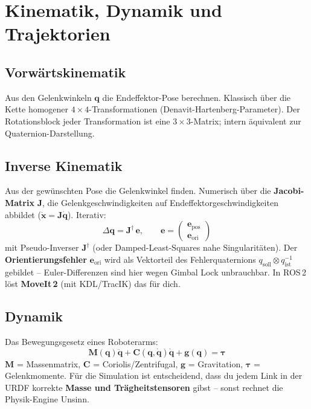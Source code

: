 
\chapter{Kinematik, Dynamik und Trajektorien}
\label{ch:kinematik}

\section{Vorwärtskinematik}
Aus den Gelenkwinkeln $\bm{q}$ die Endeffektor-Pose berechnen. Klassisch über
die Kette homogener $4\times4$-Transformationen (Denavit-Hartenberg-Parameter).
Der Rotationsblock jeder Transformation ist eine $3\times3$-Matrix; intern
äquivalent zur Quaternion-Darstellung.

\section{Inverse Kinematik}
Aus der gewünschten Pose die Gelenkwinkel finden. Numerisch über die
\textbf{Jacobi-Matrix} $\bm{J}$, die Gelenkgeschwindigkeiten auf
Endeffektorgeschwindigkeiten abbildet ($\dot{\bm{x}} = \bm{J}\dot{\bm{q}}$).
Iterativ:
\begin{equation}
\Delta\bm{q} = \bm{J}^{\dagger}\,\bm{e},
\qquad
\bm{e} = \begin{pmatrix}\bm{e}_{\text{pos}} \\ \bm{e}_{\text{ori}}\end{pmatrix}
\end{equation}
mit Pseudo-Inverser $\bm{J}^\dagger$ (oder Damped-Least-Squares nahe
Singularitäten). Der \textbf{Orientierungsfehler} $\bm{e}_{\text{ori}}$ wird als
Vektorteil des Fehlerquaternions $q_{\text{soll}}\otimes q_{\text{ist}}^{-1}$
gebildet -- Euler-Differenzen sind hier wegen Gimbal Lock unbrauchbar. In
ROS\,2 löst \textbf{MoveIt\,2} (mit KDL/TracIK) das für dich.

\section{Dynamik}
Das Bewegungsgesetz eines Roboterarms:
\begin{equation}
\bm{M}(\bm{q})\ddot{\bm{q}} + \bm{C}(\bm{q},\dot{\bm{q}})\dot{\bm{q}}
+ \bm{g}(\bm{q}) = \bm{\tau}
\end{equation}
$\bm{M}$ = Massenmatrix, $\bm{C}$ = Coriolis/Zentrifugal,
$\bm{g}$ = Gravitation, $\bm{\tau}$ = Gelenkmomente. Für die Simulation ist
entscheidend, dass du jedem Link in der URDF korrekte \textbf{Masse und
Trägheitstensoren} gibst -- sonst rechnet die Physik-Engine Unsinn.


